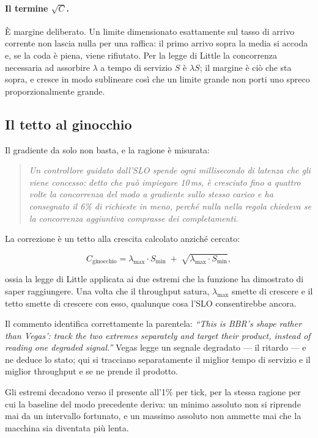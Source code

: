 \paragraph{Il termine $\sqrt{C}$.} \`E margine deliberato. Un limite
dimensionato esattamente sul tasso di arrivo corrente non lascia nulla per una
raffica: il primo arrivo sopra la media si accoda e, se la coda \`e piena, viene
rifiutato. Per la legge di Little la concorrenza necessaria ad assorbire
$\lambda$ a tempo di servizio $S$ \`e $\lambda S$; il margine \`e ci\`o che sta
sopra, e cresce in modo sublineare cos\`i che un limite grande non porti uno
spreco proporzionalmente grande.

\subsection{Il tetto al ginocchio}

Il gradiente da solo non basta, e la ragione \`e misurata:

\begin{quote}\itshape
Un controllore guidato dall'SLO spende ogni millisecondo di latenza che gli viene
concesso: detto che pu\`o impiegare 10\,ms, \`e cresciuto fino a quattro volte la
concorrenza del modo a gradiente sullo stesso carico e ha consegnato il 6\% di
richieste in meno, perch\'e nulla nella regola chiedeva se la concorrenza
aggiuntiva comprasse dei completamenti.
\end{quote}

La correzione \`e un tetto alla crescita calcolato anzich\'e cercato:

\[
  C_{\text{ginocchio}} = \lambda_{\max} \cdot S_{\min}
  \;+\; \sqrt{\lambda_{\max} \cdot S_{\min}},
\]

ossia la legge di Little applicata ai due estremi che la funzione ha dimostrato
di saper raggiungere. Una volta che il throughput satura, $\lambda_{\max}$ smette
di crescere e il tetto smette di crescere con esso, qualunque cosa l'SLO
consentirebbe ancora.

Il commento identifica correttamente la parentela: \emph{``This is BBR's shape
rather than Vegas': track the two extremes separately and target their product,
instead of reading one degraded signal.''} Vegas legge un segnale degradato --- il
ritardo --- e ne deduce lo stato; qui si tracciano separatamente il miglior tempo
di servizio e il miglior throughput e se ne prende il prodotto.

Gli estremi decadono verso il presente all'1\% per tick, per la stessa ragione
per cui la baseline del modo precedente deriva: un minimo assoluto non si riprende
mai da un intervallo fortunato, e un massimo assoluto non ammette mai che la
macchina sia diventata pi\`u lenta.

